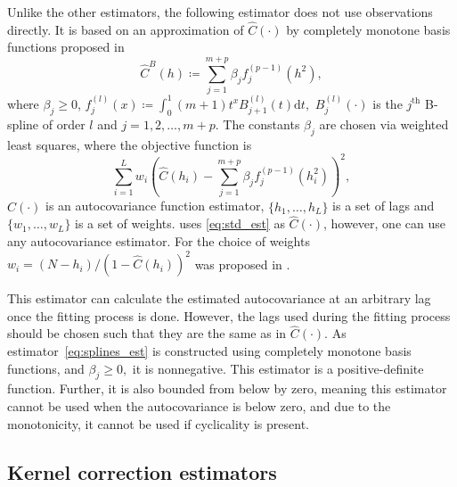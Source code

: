 Unlike the other estimators, the following estimator does not use
observations directly. It is based on an approximation of
\(\widehat{C}(\cdot)\) by completely monotone basis functions proposed
in \cite{Choi2013}\\
\begin{equation}
 \label{eq:splines_est}
    \widehat{C}^{B}(h) \coloneq \sum_{j=1}^{m + p} \beta_{j} f_{j}^{(p - 1)} \left(h^{2}\right) ,
\end{equation} where \(\beta_{j} \geq 0\),
\(f_{j}^{(l)} (x) \coloneq \int_{0}^{1} (m + 1) t^{x} B_{j + 1}^{(l)} (t) \text{d} t,\)
\(B_{j}^{(l)}(\cdot)\) is the \(j^{\text{th}}\) B-spline of order \(l\)
and \(j = 1, 2, \dots , m + p\). The constants \(\beta_{j}\) are chosen
via weighted least squares, where the objective function is
\[\sum_{i = 1}^{L} w_{i} \left( \widehat{C}(h_{i}) - \sum_{j=1}^{m + p} \beta_{j} f_{j}^{(p - 1)} \left(h_{i}^{2}\right) \right)^{2} ,\]
\(\widehat{C}(\cdot)\) is an autocovariance function estimator,
\(\{ h_{1} , \dots , h_{L} \}\) is a set of lags and
\(\{ w_{1}, \dots , w_{L} \}\) is a set of weights. \cite{Choi2013} uses
\eqref{eq:std_est} as \(\widehat{C}(\cdot)\), however, one can use any
autocovariance estimator. For the choice of weights
\(w_{i} = \left(N-h_{i}\right) / \left(1 - \widehat{C}(h_{i})\right)^{2}\)
was proposed in \cite{Cressie1985}.

This estimator can calculate the estimated autocovariance at an
arbitrary lag once the fitting process is done. However, the lags used
during the fitting process should be chosen such that they are the same
as in \(\widehat{C}(\cdot).\) As estimator~\eqref{eq:splines_est} is
constructed using completely monotone basis functions, and
\(\beta_{j} \geq 0,\) it is nonnegative. This estimator is a
positive-definite function. Further, it is also bounded from below by
zero, meaning this estimator cannot be used when the autocovariance is
below zero, and due to the monotonicity, it cannot be used if
cyclicality is present.

\subsection{Kernel correction
estimators}\label{kernel-correction-estimators}


